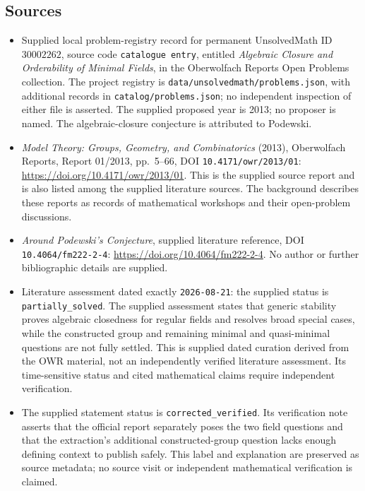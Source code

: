 \documentclass[11pt]{article}
\begin{document}
\subsection{Sources}
\begin{itemize}
\item Supplied local problem-registry record for permanent UnsolvedMath ID \(30002262\), source code \texttt{catalogue entry}, entitled \emph{Algebraic Closure and Orderability of Minimal Fields}, in the Oberwolfach Reports Open Problems collection. The project registry is \texttt{data/unsolvedmath/problems.json}, with additional records in \texttt{catalog/problems.json}; no independent inspection of either file is asserted. The supplied proposed year is 2013; no proposer is named. The algebraic-closure conjecture is attributed to Podewski.
\item \emph{Model Theory: Groups, Geometry, and Combinatorics} (2013), Oberwolfach Reports, Report 01/2013, pp.\ 5--66, DOI \texttt{10.4171/owr/2013/01}: \url{https://doi.org/10.4171/owr/2013/01}. This is the supplied source report and is also listed among the supplied literature sources. The background describes these reports as records of mathematical workshops and their open-problem discussions.
\item \emph{Around Podewski's Conjecture}, supplied literature reference, DOI \texttt{10.4064/fm222-2-4}: \url{https://doi.org/10.4064/fm222-2-4}. No author or further bibliographic details are supplied.
\item Literature assessment dated exactly \texttt{2026-08-21}: the supplied status is \texttt{partially\_solved}. The supplied assessment states that generic stability proves algebraic closedness for regular fields and resolves broad special cases, while the constructed group and remaining minimal and quasi-minimal questions are not fully settled. This is supplied dated curation derived from the OWR material, not an independently verified literature assessment. Its time-sensitive status and cited mathematical claims require independent verification.
\item The supplied statement status is \texttt{corrected\_verified}. Its verification note asserts that the official report separately poses the two field questions and that the extraction's additional constructed-group question lacks enough defining context to publish safely. This label and explanation are preserved as source metadata; no source visit or independent mathematical verification is claimed.
\end{itemize}
\end{document}
